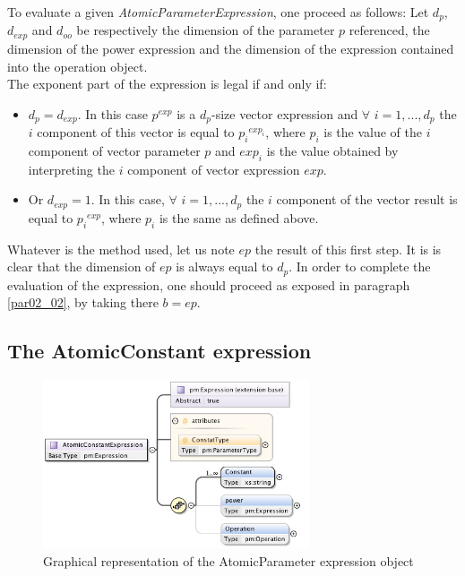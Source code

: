 \documentclass[a4paper,11pt] {article}
\begin{document}
To evaluate a given {\it AtomicParameterExpression}, one proceed as follows: 
Let $d_p$, $d_{exp}$ and $d_{oo}$ be respectively the dimension of the parameter $p$ referenced, the
dimension of the power expression and the dimension of the expression contained into the operation
object.\\
The exponent part of the expression is legal if and only if:
\begin{itemize}
\item $d_p=d_{exp}$. In this case $p^{exp}$ is a $d_p$-size vector expression and $\forall$
$i=1,...,d_p$ the $i$ component of this vector is equal to ${p_i}^{exp_i}$, where $p_i$ is the value
of the $i$ component of vector parameter $p$ and $exp_i$ is the value obtained by interpreting the
$i$ component of vector expression $exp$.
\item Or $d_{exp}=1$. In this case, $\forall$ $i=1,...,d_p$ the $i$ component of the vector result
is equal to ${p_i}^{exp}$, where $p_i$ is the same as defined above.\\
\end{itemize} 

Whatever is the method used, let us note $ep$ the result of this first step. It is is clear that the
dimension of $ep$ is always equal to $d_p$. In order to complete the evaluation of the expression,
one should proceed as exposed in paragraph \ref{par02_02}, by taking there $b=ep$.

\subsection{The AtomicConstant expression}\label{par02_03}
\begin{figure}[htbp]
\begin{center}
\includegraphics[width=0.7\textwidth]{pictures/AtomicConstant.jpg} 
\caption{Graphical representation of the AtomicParameter expression object}
\label{Pic-AtomicConstant}
\end{center}
\end{figure}
\end{document}
